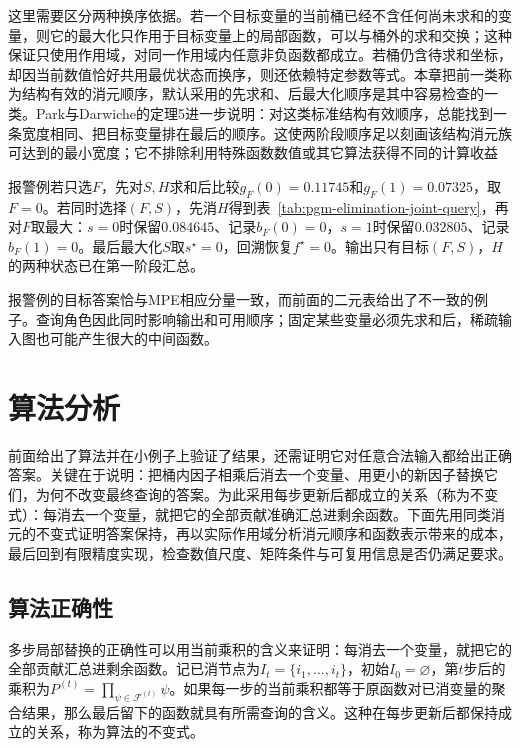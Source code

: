 这里需要区分两种换序依据。若一个目标变量的当前桶已经不含任何尚未求和的变量，则它的最大化只作用于目标变量上的局部函数，可以与桶外的求和交换；这种保证只使用作用域，对同一作用域内任意非负函数都成立。若桶仍含待求和坐标，却因当前数值恰好共用最优状态而换序，则还依赖特定参数等式。本章把前一类称为结构有效的消元顺序，默认采用的先求和、后最大化顺序是其中容易检查的一类。Park与Darwiche的定理5进一步说明：对这类标准结构有效顺序，总能找到一条宽度相同、把目标变量排在最后的顺序。这使两阶段顺序足以刻画该结构消元族可达到的最小宽度；它不排除利用特殊函数数值或其它算法获得不同的计算收益

报警例若只选$F$，先对$S,H$求和后比较$g_F(0)=0.11745$和$g_F(1)=0.07325$，取$F=0$。若同时选择$(F,S)$，先消$H$得到表~\ref{tab:pgm-elimination-joint-query}，再对$F$取最大：$s=0$时保留$0.084645$、记录$b_F(0)=0$，$s=1$时保留$0.032805$、记录$b_F(1)=0$。最后最大化$S$取$s^\star=0$，回溯恢复$f^\star=0$。输出只有目标$(F,S)$，$H$的两种状态已在第一阶段汇总。

报警例的目标答案恰与MPE相应分量一致，而前面的二元表给出了不一致的例子。查询角色因此同时影响输出和可用顺序；固定某些变量必须先求和后，稀疏输入图也可能产生很大的中间函数。

\section{算法分析}
\label{sec:pgm-elimination-analysis}

前面给出了算法并在小例子上验证了结果，还需证明它对任意合法输入都给出正确答案。关键在于说明：把桶内因子相乘后消去一个变量、用更小的新因子替换它们，为何不改变最终查询的答案。为此采用每步更新后都成立的关系（称为不变式）：每消去一个变量，就把它的全部贡献准确汇总进剩余函数。下面先用同类消元的不变式证明答案保持，再以实际作用域分析消元顺序和函数表示带来的成本，最后回到有限精度实现，检查数值尺度、矩阵条件与可复用信息是否仍满足要求。

\subsection{算法正确性}
\label{sec:pgm-elimination-correctness}

多步局部替换的正确性可以用当前乘积的含义来证明：每消去一个变量，就把它的全部贡献汇总进剩余函数。记已消节点为$I_t=\{i_1,\ldots,i_t\}$，初始$I_0=\varnothing$，第$t$步后的乘积为$P^{(t)}=\prod_{\psi\in\mathcal{F}^{(t)}}\psi$。如果每一步的当前乘积都等于原函数对已消变量的聚合结果，那么最后留下的函数就具有所需查询的含义。这种在每步更新后都保持成立的关系，称为算法的不变式。

